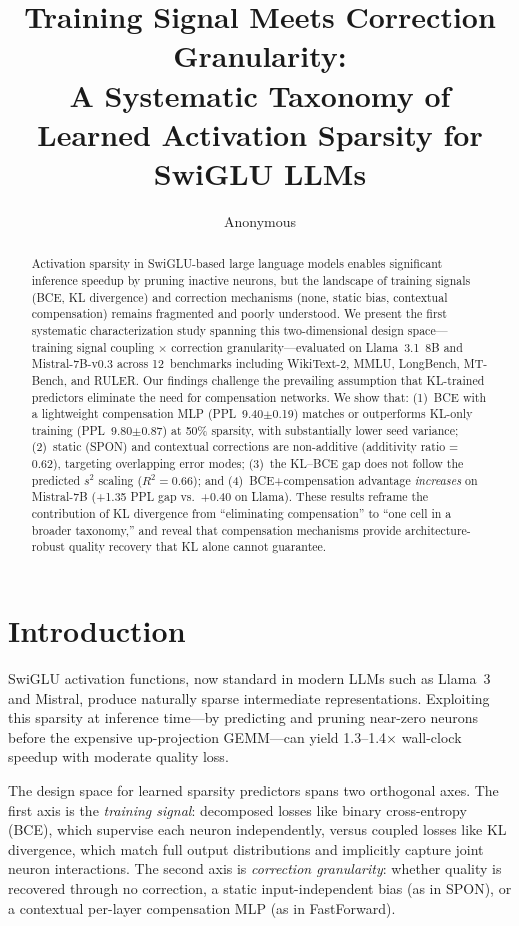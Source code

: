 \documentclass[11pt]{article}
\title{Training Signal Meets Correction Granularity:\\A Systematic Taxonomy of Learned Activation Sparsity for SwiGLU LLMs}
\author{Anonymous}
\date{}
\begin{document}
\maketitle

\begin{abstract}
Activation sparsity in SwiGLU-based large language models enables significant inference speedup by pruning inactive neurons, but the landscape of training signals (BCE, KL divergence) and correction mechanisms (none, static bias, contextual compensation) remains fragmented and poorly understood.
We present the first systematic characterization study spanning this two-dimensional design space---training signal coupling $\times$ correction granularity---evaluated on Llama~3.1~8B and Mistral-7B-v0.3 across 12~benchmarks including WikiText-2, MMLU, LongBench, MT-Bench, and RULER.
Our findings challenge the prevailing assumption that KL-trained predictors eliminate the need for compensation networks.
We show that: (1)~BCE with a lightweight compensation MLP (PPL~9.40$\pm$0.19) matches or outperforms KL-only training (PPL~9.80$\pm$0.87) at 50\% sparsity, with substantially lower seed variance; (2)~static (SPON) and contextual corrections are non-additive (additivity ratio = 0.62), targeting overlapping error modes; (3)~the KL--BCE gap does not follow the predicted $s^2$ scaling ($R^2 = 0.66$); and (4)~BCE+compensation advantage \emph{increases} on Mistral-7B (+1.35 PPL gap vs.\ +0.40 on Llama).
These results reframe the contribution of KL divergence from ``eliminating compensation'' to ``one cell in a broader taxonomy,'' and reveal that compensation mechanisms provide architecture-robust quality recovery that KL alone cannot guarantee.
\end{abstract}

\section{Introduction}

SwiGLU activation functions, now standard in modern LLMs such as Llama~3 and Mistral, produce naturally sparse intermediate representations.
Exploiting this sparsity at inference time---by predicting and pruning near-zero neurons before the expensive up-projection GEMM---can yield 1.3--1.4$\times$ wall-clock speedup with moderate quality loss.

The design space for learned sparsity predictors spans two orthogonal axes.
The first axis is the \emph{training signal}: decomposed losses like binary cross-entropy (BCE), which supervise each neuron independently, versus coupled losses like KL divergence, which match full output distributions and implicitly capture joint neuron interactions.
The second axis is \emph{correction granularity}: whether quality is recovered through no correction, a static input-independent bias (as in SPON), or a contextual per-layer compensation MLP (as in FastForward).
\end{document}
